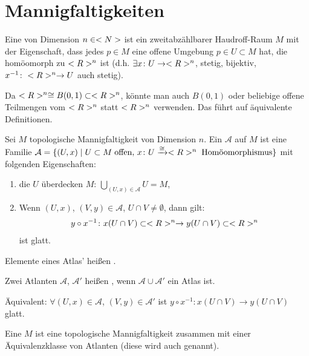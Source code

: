 \section{Mannigfaltigkeiten}
\begin{definition}
	Eine  von Dimension $n\in<N>$ ist ein zweitabzählbarer Haudroff-Raum $M$ mit der Eigenschaft, dass jedes $p\in M$ eine offene Umgebung $p\in U\subset M$ hat, die homöomorph zu $<R>^n$ ist (d.h. $\exists x\colon U\to<R>^n$, stetig, bijektiv, $x^{-1}\colon <R>^n\to U$ auch stetig).
\end{definition}

\begin{remark}
	Da $<R>^n\cong B(0,1)\subset<R>^n$, könnte man auch $B(0,1)$ oder beliebige offene Teilmengen vom $<R>^n$ statt $<R>^n$ verwenden. Das führt auf äquivalente Definitionen.
\end{remark}

\begin{definition}
	Sei $M$ topologische Mannigfaltigkeit von Dimension $n$. Ein  $\mathcal A$ auf $M$ ist eine Familie $\mathcal A = \{(U,x)\mid U\subset M\;\text{offen},\,x\colon U\xrightarrow{\cong}<R>^n\;\text{Homöomorphismus}\}$ mit folgenden Eigenschaften: \begin{enumerate}[label={(\arabic*)}]
		\item die $U$ überdecken $M$: $\bigcup_{(U,x)\in\mathcal A} U = M$,
		\item Wenn $(U,x)$, $(V,y)\in\mathcal A$, $U\cap V\neq \emptyset$, dann gilt: \begin{align*}
			y\circ x^{-1}\colon x(U\cap V)\subset<R>^n\to y(U\cap V)\subset<R>^n
		\end{align*}
		ist glatt.
	\end{enumerate}
	Elemente eines Atlas' heißen .
\end{definition}

\begin{definition}
	Zwei Atlanten $\mathcal A$, $\mathcal A'$ heißen , wenn $\mathcal A\cup\mathcal A'$ ein Atlas ist.
	
	Äquivalent: $\forall (U,x)\in \mathcal A$, $(V,y)\in\mathcal A'$ ist $y\circ x^{-1}\colon x(U\cap V)\to y(U\cap V)$ glatt.
\end{definition}

\begin{definition}
	Eine  $M$ ist eine topologische Mannigfaltigkeit zusammen mit einer Äquivalenzklasse von Atlanten (diese wird auch  genannt).
\end{definition}

